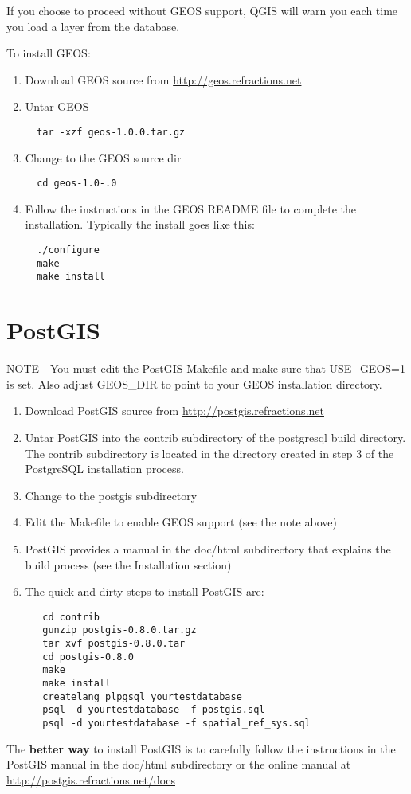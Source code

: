 \documentclass[a4paper,10pt]{article}
\begin{document}
  If you choose to proceed without GEOS support, QGIS will warn you each time you load a layer from the database.

  To install GEOS:
  \begin{enumerate}
  \item Download GEOS source from \url{http://geos.refractions.net}
  \item Untar GEOS
  \begin{verbatim}
  tar -xzf geos-1.0.0.tar.gz
  \end{verbatim}
  \item Change to the GEOS source dir
  \begin{verbatim}
  cd geos-1.0-.0
  \end{verbatim}
  \item Follow the instructions in the GEOS README file to complete the installation. Typically the install goes like this:
  \begin{verbatim}
  ./configure
  make
  make install
  \end{verbatim}

  \end{enumerate}

  \section{PostGIS}

  NOTE - You must edit the PostGIS Makefile and make sure that USE\_GEOS=1 is
  set. Also adjust GEOS\_DIR to point to your GEOS installation directory.
  \begin{enumerate}
  \item Download PostGIS source from \url{http://postgis.refractions.net} 

  \item Untar PostGIS into the contrib subdirectory of the postgresql build directory. The contrib subdirectory is located in the directory created in step 3 of the PostgreSQL installation process.
  \item Change to the postgis subdirectory
  \item Edit the Makefile to enable GEOS support (see the note above)
\item PostGIS provides a manual in the doc/html subdirectory that explains the build process (see the Installation section)
  \item The quick and dirty steps to install PostGIS are:
  \begin{verbatim}
   cd contrib
   gunzip postgis-0.8.0.tar.gz 
   tar xvf postgis-0.8.0.tar 
   cd postgis-0.8.0 
   make 
   make install 
   createlang plpgsql yourtestdatabase 
   psql -d yourtestdatabase -f postgis.sql 
   psql -d yourtestdatabase -f spatial_ref_sys.sql 
  \end{verbatim}
  \end{enumerate}
The \textbf{better way} to install PostGIS is to carefully follow the instructions in the PostGIS manual in the doc/html subdirectory or the online manual at \url{http://postgis.refractions.net/docs}
\end{document}
